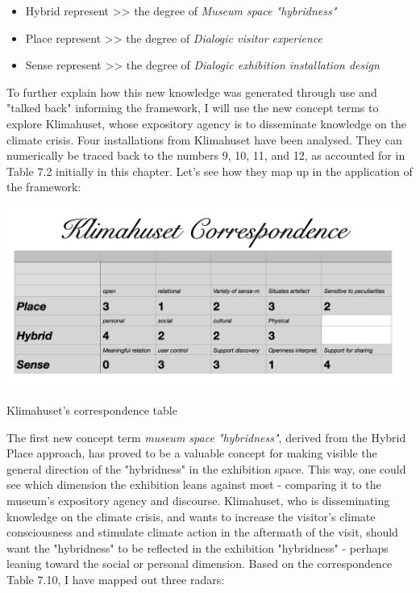 \begin{itemize}
    \item Hybrid represent >> the degree of \textit{Museum space "hybridness"}
    \item Place represent >> the degree of \textit{Dialogic visitor experience}
    \item Sense represent >> the degree of \textit{Dialogic exhibition installation design}
\end{itemize}

To further explain how this new knowledge was generated through use and "talked back" informing the framework, I will use the new concept terms to explore Klimahuset, whose expository agency is to disseminate knowledge on the climate crisis. Four installations from Klimahuset have been analysed. They can numerically be traced back to the numbers 9, 10, 11, and 12, as accounted for in Table 7.2 initially in this chapter. Let's see how they map up in the application of the framework:

\begin{table}[H]
\centering 
\includegraphics[width=13cm]{pictures/analysis/klimahuset_corr.png}
\caption{Klimahuset's correspondence table}
\end{table}

The first new concept term \textit{museum space "hybridness"}, derived from the Hybrid Place approach, has proved to be a valuable concept for making visible the general direction of the "hybridness" in the exhibition space. This way, one could see which dimension the exhibition leans against most - comparing it to the museum's expository agency and discourse. Klimahuset, who is disseminating knowledge on the climate crisis, and wants to increase the visitor's climate consciousness and stimulate climate action in the aftermath of the visit, should want the "hybridness" to be reflected in the exhibition "hybridness" - perhaps leaning toward the social or personal dimension. Based on the correspondence Table 7.10, I have mapped out three radars:

